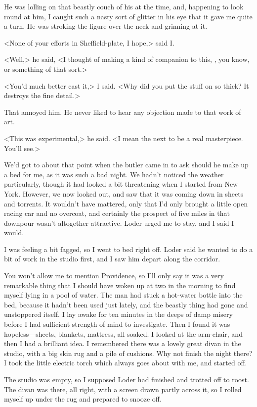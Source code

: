 He was lolling on that beastly couch of his at the time, and, happening to look round at him, I caught such a nasty sort of glitter in his eye that it gave me quite a turn. He was stroking the figure over the neck and grinning at it.

<None of your efforts in Sheffield-plate, I hope,> said I\@.

<Well,> he said, <I thought of making a kind of companion to this, , you know, or something of that sort.>

<You'd much better cast it,> I said. <Why did you put the stuff on so thick? It destroys the fine detail.>

That annoyed him. He never liked to hear any objection made to that work of art.

<This was experimental,> he said. <I mean the next to be a real masterpiece. You'll see.>

We'd got to about that point when the butler came in to ask should he make up a bed for me, as it was such a bad night. We hadn't noticed the weather particularly, though it had looked a bit threatening when I started from New York. However, we now looked out, and saw that it was coming down in sheets and torrents. It wouldn't have mattered, only that I'd only brought a little open racing car and no overcoat, and certainly the prospect of five miles in that downpour wasn't altogether attractive. Loder urged me to stay, and I said I would.

I was feeling a bit fagged, so I went to bed right off. Loder said he wanted to do a bit of work in the studio first, and I saw him depart along the corridor.

You won't allow me to mention Providence, so I'll only say it was a very remarkable thing that I should have woken up at two in the morning to find myself lying in a pool of water. The man had stuck a hot-water bottle into the bed, because it hadn't been used just lately, and the beastly thing had gone and unstoppered itself. I lay awake for ten minutes in the deeps of damp misery before I had sufficient strength of mind to investigate. Then I found it was hopeless—sheets, blankets, mattress, all soaked. I looked at the arm-chair, and then I had a brilliant idea. I remembered there was a lovely great divan in the studio, with a big skin rug and a pile of cushions. Why not finish the night there? I took the little electric torch which always goes about with me, and started off.

The studio was empty, so I supposed Loder had finished and trotted off to roost. The divan was there, all right, with a screen drawn partly across it, so I rolled myself up under the rug and prepared to snooze off.

